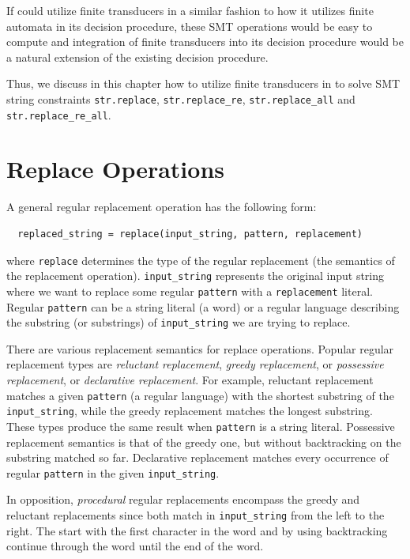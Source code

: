 If \noodler could utilize finite transducers in a similar fashion to how it utilizes finite automata in its decision procedure, these SMT operations would be easy to compute and integration of finite transducers into its decision procedure would be a natural extension of the existing decision procedure.

Thus, we discuss in this chapter how to utilize finite transducers in \noodler to solve SMT string constraints \texttt{str.replace}, \texttt{str.replace\_re}, \texttt{str.replace\_all} and \texttt{str.replace\_re\_all}.

\section{Replace Operations}
A general regular replacement operation has the following form:
\begin{center}
\begin{verbatim}
  replaced_string = replace(input_string, pattern, replacement)
\end{verbatim}
\end{center}
where \texttt{replace} determines the type of the regular replacement (the semantics of the replacement operation).
\texttt{input\_string} represents the original input string where we want to replace some regular \texttt{pattern} with a \texttt{replacement} literal.
Regular \texttt{pattern} can be a string literal (a word) or a regular language describing the substring (or substrings) of \texttt{input\_string} we are trying to replace.

There are various replacement semantics for replace operations. Popular regular replacement types are \emph{reluctant replacement}, \emph{greedy replacement}, or \emph{possessive replacement}, or \emph{declarative replacement}.
For example, reluctant replacement matches a given \texttt{pattern} (a regular language) with the shortest substring of the \texttt{input\_string}, while the greedy replacement matches the longest substring. These types produce the same result when \texttt{pattern} is a string literal.
Possessive replacement semantics is that of the greedy one, but without backtracking on the substring matched so far.
Declarative replacement matches every occurrence of regular \texttt{pattern} in the given \texttt{input\_string}.

In opposition, \emph{procedural} regular replacements encompass the greedy and reluctant replacements since both match in \texttt{input\_string} from the left to the right.
The start with the first character in the word and by using backtracking continue through the word until the end of the word.

